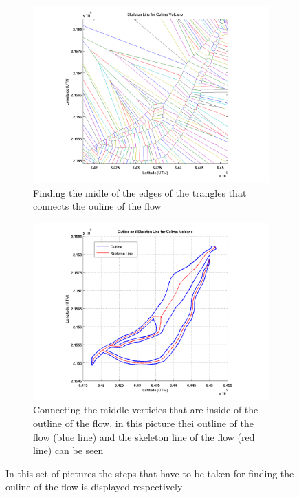 \documentclass[letterpaper,10pt]{article}
\begin{document}
\begin{figure}
        \begin{subfigure}[b]{0.45\textwidth}
                \includegraphics[width=\textwidth]{IMAGES/pics/Skeleton_line.png}
                \caption{Finding the midle of the edges of the trangles that connects the ouline of the flow}
                \label{fig:veroni}
        \end{subfigure}
        \begin{subfigure}[b]{0.45\textwidth}
                \includegraphics[width=\textwidth]{IMAGES/pics/Outline_Skeleton_line.png}
                \caption{Connecting the middle verticies that are inside of the outline of the flow, in this picture thei
                outline of the flow (blue line) and the skeleton line of the flow (red line) can be seen}
                \label{fig:skeleton}
        \end{subfigure}
                
        \caption{In this set of pictures the steps that have to be taken for finding the ouline of the flow is displayed 
        respectively}\label{fig:skeleton_line_proc}
\end{figure}
\end{document}
